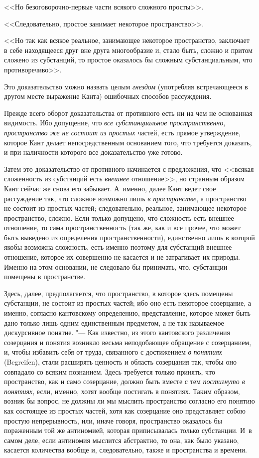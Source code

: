 <<Но безоговорочно-первые части всякого сложного просты>>.

<<Следовательно, простое занимает некоторое пространство>>.

<<Но так как всякое реальное, занимающее некоторое пространство, заключает в
себе находящееся друг вне друга многообразие и, стало быть, сложно и притом
сложено из субстанций, то простое оказалось бы сложным субстанциальным, что
противоречиво>>.

Это доказательство можно назвать целым {\em гнездом}
(употребляя встречающееся в другом месте выражение Канта) ошибочных
способов рассуждения.

Прежде всего оборот доказательства от противного есть ни на чем не
основанная видимость. Ибо допущение, что {\em все
субстанциальное пространственно}, {\em пространство же
не состоит из простых} частей, есть прямое утверждение, которое Кант делает
непосредственным основанием того, что требуется доказать, и при наличности
которого все доказательство уже готово.

Затем это доказательство от противного начинается с предложения, что <<всякая
сложенность из субстанций есть {\em внешнее}
отношение>>, но странным образом Кант сейчас же снова его забывает.
А~именно, далее Кант ведет свое рассуждение так, что сложное возможно лишь
{\em в пространстве}, а пространство не состоит из
простых частей; следовательно, реальное, занимающее некоторое пространство,
сложно. Если только допущено, что сложность есть внешнее отношение, то сама
пространственность (так же, как и все прочее, что может быть выведено из
определения пространственности), единственно лишь в которой якобы возможна
сложность, есть именно поэтому для субстанций внешнее отношение, которое их
совершенно не касается и не затрагивает их природы. Именно на этом
основании, не следовало бы принимать, что, субстанции помещены в
пространстве.

Здесь, далее, предполагается, что пространство, в которое здесь помещены
субстанции, не состоит из простых частей; ибо оно есть некоторое
созерцание, а именно, согласно кантовскому определению, представление,
которое может быть дано только лишь одним единственным предметом, а не так
называемое дискурсивное понятие. "--- Как известно, из этого кантовского
различения созерцания и понятия возникло весьма неподобающее обращение с
созерцанием, и, чтобы избавить себя от труда, связанного с достижением
{\em в понятиях} (Begreifen), стали расширять ценность
и область созерцания так, чтобы оно совпадало со всяким познанием. Здесь
требуется только принять, что пространство, как и само созерцание, должно
быть вместе с тем {\em постигнуто в понятиях}, если,
именно, хотят вообще постигать в понятиях. Таким образом, возник бы вопрос,
не должны ли мы мыслить пространство согласно его понятию как состоящее из
простых частей, хотя как созерцание оно представляет собою простую
непрерывность, или, иначе говоря, пространство оказалось бы пораженным той
же антиномией, которая приписывалась только субстанции. И~в самом деле,
если антиномия мыслится абстрактно, то она, как было указано, касается
количества вообще и, следовательно, также и пространства и времени.

